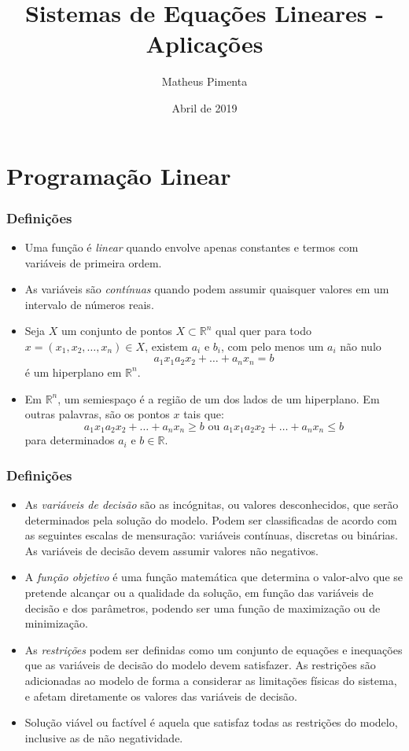 \documentclass[hyperref={pdfpagelabels=false}]{beamer}
\title{Sistemas de Equações Lineares - Aplicações}
\author[Matheus Pimenta]{Matheus Pimenta}
\institute[UTFPR-CP]{\normalsize Universidade Tecnológica Federal do Paraná \\
	Câmpus Cornélio Procópio
}
\date{Abril de 2019}
\begin{document}
	
\begin{frame}
\titlepage
\end{frame} 




\section{Programação Linear} 


\begin{frame}
\frametitle{Definições} 
\begin{itemize}

	\item Uma função é \emph{linear} quando envolve apenas constantes e termos com variáveis de primeira ordem. \pause
	\item As variáveis são \emph{contínuas} quando podem assumir quaisquer valores em um intervalo de números reais. \pause
	\item Seja $X$ um conjunto de pontos $X \subset \mathbb{R}^n$ qual quer para todo $x = (x_1,x_2,\dots,x_n) \in X$, existem $a_i$ e $b_i$, com pelo menos um $a_i$ não nulo $$a_1x_1a_2x_2+\dots+a_nx_n=b$$ é um hiperplano em $\mathbb{R}^n$. \pause
	\item Em $\mathbb{R}^n$, um semiespaço é a região de um dos lados de um hiperplano. Em outras palavras, são os pontos $x$ tais que: $$a_1x_1a_2x_2+\dots+a_nx_n \geq b \text{ ou } a_1x_1a_2x_2+\dots+a_nx_n \leq b$$ para determinados $a_i$ e $b \in \mathbb{R}$.
\end{itemize}
\end{frame}

\begin{frame}
\frametitle{Definições}
\begin{itemize}
	\item As \emph{variáveis de decisão} são as incógnitas, ou valores desconhecidos, que serão determinados pela solução do modelo. Podem ser classificadas de acordo com as seguintes escalas de mensuração: variáveis contínuas, discretas ou binárias. As variáveis de decisão devem assumir valores não negativos. \pause
	\item A \emph{função objetivo} é uma função matemática que determina o valor-alvo que se pretende alcançar ou a qualidade da solução, em função das variáveis de decisão e dos parâmetros, podendo ser uma função de maximização ou de minimização. \pause
	\item As \emph{restrições} podem ser definidas como um conjunto de equações e inequações que as variáveis de decisão do modelo devem satisfazer. As restrições são adicionadas ao modelo de forma a considerar as limitações físicas do sistema, e afetam diretamente os valores das variáveis de decisão. \pause
	\item Solução viável ou factível é aquela que satisfaz todas as restrições do modelo, inclusive as de não negatividade.
\end{itemize}

\end{frame}
\end{document}
